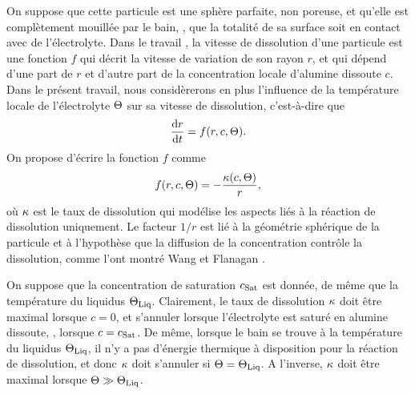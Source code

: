 On suppose que cette particule est une sphère parfaite, non poreuse,
et qu'elle est complètement mouillée par le bain, \ie, que la totalité
de sa surface soit en contact avec de l'électrolyte. Dans le travail
\cite{Hofer2011}, la vitesse de dissolution d'une particule est une
fonction $f$ qui décrit la vitesse de variation de son rayon $r$, et
qui dépend d'une part de $r$ et d'autre part de la concentration
locale d'alumine dissoute $c$. Dans le présent travail, nous
considèrerons en plus l'influence de la température locale de
l'électrolyte $\Theta$ sur sa vitesse de dissolution,
c'est-à-dire que
\begin{equation}\label{eq:radius-edo}
  \frac{\mathrm dr}{\mathrm dt} = f(r, c, \Theta).
\end{equation}
On propose d'écrire la fonction $f$ comme
\begin{equation}\label{eq:dissolution-velocity}
  f(r, c, \Theta) = -\frac{\kappa(c, \Theta)}{r},
\end{equation}
où $\kappa$ est le taux de dissolution qui modélise les
aspects liés à la réaction de dissolution uniquement. Le facteur $1/r$
est lié à la géométrie sphérique de la particule et à l'hypothèse que
la diffusion de la concentration contrôle la dissolution, comme l'ont
montré Wang et Flanagan \cite{Wang1999}.

On suppose que la concentration de saturation $c_\text{Sat}$ est donnée, de
même que la température du liquidus $\Theta_\text{Liq}$. Clairement, le taux de
dissolution $\kappa$ doit être maximal lorsque $c = 0$, et
s'annuler lorsque l'électrolyte est saturé en alumine dissoute, \ie, lorsque $c
= c_\text{Sat}$. De même, lorsque le bain se trouve à la température du
liquidus $\Theta_\text{Liq}$, il n'y a pas d'énergie thermique à disposition pour
la réaction de dissolution, et donc $\kappa$ doit s'annuler
si $\Theta = \Theta_\text{Liq}$. A l'inverse, $\kappa$ doit être
maximal lorsque $\Theta\gg\Theta_\text{Liq}$.

